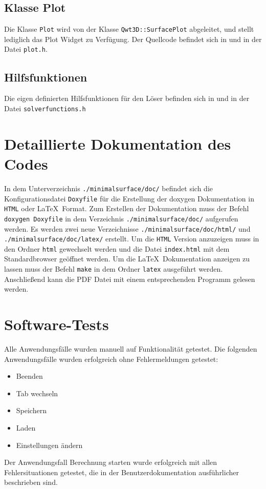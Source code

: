 \subsection{Klasse Plot}
Die Klasse {\tt Plot} wird von der Klasse {\tt Qwt3D::SurfacePlot} abgeleitet, und stellt lediglich das Plot Widget zu Verf\"ugung. Der Quellcode befindet sich in  und in der Datei {\tt plot.h}.

\subsection{Hilfsfunktionen}
Die eigen definierten Hilfsfunktionen f\"ur den L\"oser befinden sich in  und in der Datei {\tt solverfunctions.h}

\section{Detaillierte Dokumentation des Codes}
In dem Unterverzeichnis {\tt ./minimalsurface/doc/} befindet sich die Konfigurationsdatei {\tt Doxyfile} f\"ur die Erstellung der doxygen Dokumentation in {\tt HTML} oder \LaTeX\ Format. Zum Erstellen der Dokumentation muss der Befehl {\tt doxygen Doxyfile} in dem Verzeichnis {\tt ./minimalsurface/doc/} aufgerufen werden. Es werden zwei neue Verzeichnisse {\tt ./minimalsurface/doc/html/} und {\tt ./minimalsurface/doc/latex/} erstellt. Um die {\tt HTML} Version anzuzeigen muss in den Ordner {\tt html} gewechselt werden und die Datei {\tt index.html} mit dem Standardbrowser ge\"offnet werden. Um die \LaTeX\ Dokumentation anzeigen zu lassen muss der Befehl {\tt make} in dem Ordner {\tt latex} ausgef\"uhrt werden. Anschlie\ss end kann die PDF Datei mit einem entsprechenden Programm gelesen werden.

\section{Software-Tests}
Alle Anwendungsf\"alle wurden manuell auf Funktionalit\"at getestet. Die folgenden Anwendungsf\"alle wurden erfolgreich ohne Fehlermeldungen getestet:
\begin{itemize}
	\item Beenden
	\item Tab wechseln
	\item Speichern
	\item Laden
	\item Einstellungen \"andern
\end{itemize}
Der Anwendungsfall Berechnung starten wurde erfolgreich mit allen Fehlersituationen getestet, die in der Benutzerdokumentation ausf\"uhrlicher beschrieben sind.